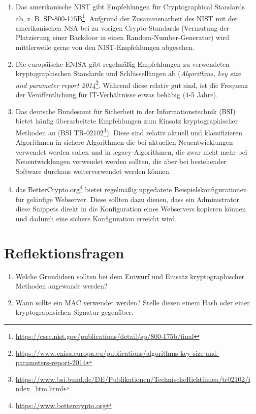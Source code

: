 \begin{enumerate}
	\item Das amerikanische NIST gibt Empfehlungen für Cryptographical Standards ab, z. B. SP-800-175B\footnote{\url{https://csrc.nist.gov/publications/detail/sp/800-175b/final}}. Aufgrund der Zusammenarbeit des NIST mit der amerikanischen NSA bei zu vorigen Crypto-Standards (Vermutung der Platzierung einer Backdoor in einen Random-Number-Generator) wird mittlerweile gerne von den NIST-Empfehlungen abgesehen.
	\item Die europäische ENISA gibt regelmäßig Empfehlungen zu verwendeten kryptographischen Standards und Schlüssellängen ab (\textit{Algorithms, key size and parameter report 2014}\footnote{\url{https://www.enisa.europa.eu/publications/algorithms-key-size-and-parameters-report-2014}}. Während diese relativ gut sind, ist die Frequenz der Veröffentlichung für IT-Verhältnisse etwas behäbig (4-5 Jahre).
	\item Das deutsche Bundesamt für Sicherheit in der Informationstechnik (BSI) bietet häufig überarbeitete Empfehlungen zum Einsatz kryptographischer Methoden an (BSI TR-02102\footnote{\url{https://www.bsi.bund.de/DE/Publikationen/TechnischeRichtlinien/tr02102/index_htm.html}}). Diese sind relativ aktuell und klassifizieren Algorithmen in sichere Algorithmen die bei aktuellen Neuentwicklungen verwendet werden sollen und in legacy-Algorithmen, die zwar nicht mehr bei Neuentwicklungen verwendet werden sollten, die aber bei bestehender Software durchaus weiterverwendet werden können.
	\item das BetterCrypto.org\footnote{\url{https://www.bettercrypto.org}} bietet regelmäßig upgedatete Beispielskonfigurationen für geläufige Webserver. Diese sollten dazu dienen, dass ein Administrator diese Snippets direkt in die Konfiguration eines Webservers kopieren können und dadurch eine sichere Konfiguration erreicht wird.
\end{enumerate}

\section{Reflektionsfragen}

\begin{enumerate}
	\item Welche Grundideen sollten bei dem Entwurf und Einsatz kryptographischer Methoden angewandt werden?
	\item Wann sollte ein MAC verwendet werden? Stelle diesen einem Hash oder einer kryptographsichen Signatur gegenüber.
\end{enumerate}
